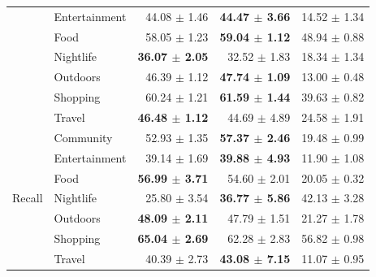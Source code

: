 \begin{table}[htbp]
\begin{tabular}{llrrr}
                           & Entertainment & 44.08 $\pm$ 1.46          & \textbf{44.47 $\pm$ 3.66} & 14.52 $\pm$ 1.34 \\
                           & Food          & 58.05 $\pm$ 1.23          & \textbf{59.04 $\pm$ 1.12} & 48.94 $\pm$ 0.88 \\
                           & Nightlife     & \textbf{36.07 $\pm$ 2.05} & 32.52 $\pm$ 1.83          & 18.34 $\pm$ 1.34 \\
                           & Outdoors      & 46.39 $\pm$ 1.12          & \textbf{47.74 $\pm$ 1.09} & 13.00 $\pm$ 0.48 \\
                           & Shopping      & 60.24 $\pm$ 1.21          & \textbf{61.59 $\pm$ 1.44} & 39.63 $\pm$ 0.82 \\
                           & Travel        & \textbf{46.48 $\pm$ 1.12} & 44.69 $\pm$ 4.89          & 24.58 $\pm$ 1.91 \\
\midrule
\multirow{7}{*}{Recall}    & Community     & 52.93 $\pm$ 1.35          & \textbf{57.37 $\pm$ 2.46} & 19.48 $\pm$ 0.99 \\
                           & Entertainment & 39.14 $\pm$ 1.69          & \textbf{39.88 $\pm$ 4.93} & 11.90 $\pm$ 1.08 \\
                           & Food          & \textbf{56.99 $\pm$ 3.71} & 54.60 $\pm$ 2.01          & 20.05 $\pm$ 0.32 \\
                           & Nightlife     & 25.80 $\pm$ 3.54          & \textbf{36.77 $\pm$ 5.86} & 42.13 $\pm$ 3.28 \\
                           & Outdoors      & \textbf{48.09 $\pm$ 2.11} & 47.79 $\pm$ 1.51          & 21.27 $\pm$ 1.78 \\
                           & Shopping      & \textbf{65.04 $\pm$ 2.69} & 62.28 $\pm$ 2.83          & 56.82 $\pm$ 0.98 \\
                           & Travel        & 40.39 $\pm$ 2.73          & \textbf{43.08 $\pm$ 7.15} & 11.07 $\pm$ 0.95 \\
\bottomrule
\end{tabular}
\end{table}
